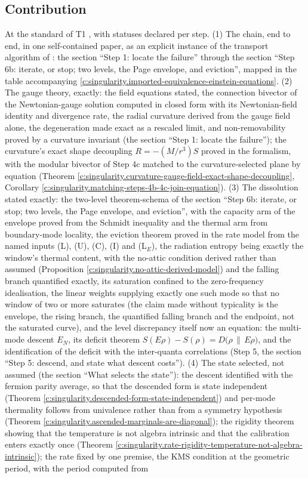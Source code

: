 \documentclass[11pt]{article}
\theoremstyle{definition}
\theoremstyle{plain}
\providecommand{\EN}{}\renewcommand{\EN}{E_{N}}
\providecommand{\rel}{}\renewcommand{\rel}[2]{D\bigl(#1 \,\|\, #2\bigr)}
\begin{document}
\subsection*{Contribution}
\label{c:note.singularity.setting-contribution}
At the standard of T1 \cite{ButlerT1}, with statuses declared per step.
(1) The chain, end to end, in one self-contained paper, as an explicit instance of the transport algorithm of \cite[\S 8.1]{ButlerT1}: the section ``Step 1: locate the failure'' through the section ``Step 6b: iterate, or stop; two levels, the Page envelope, and eviction'', mapped in the table accompanying \ref{c:singularity.imported-equivalence-einstein-equations}. (2) The gauge theory, exactly: the field equations stated, the connection bivector of the Newtonian-gauge solution computed in closed form with its Newtonian-field identity and divergence rate, the radial curvature derived from the gauge field alone, the degeneration made exact as a rescaled limit, and non-removability proved by a curvature invariant (the section ``Step 1: locate the failure''); the curvature's exact shape decoupling $R = -(M/r^3)S$ proved in the formalism, with the modular bivector of Step 4c matched to the curvature-selected plane by equation (Theorem \ref{c:singularity.curvature-gauge-field-exact-shape-decoupling}, Corollary \ref{c:singularity.matching-steps-4b-4c-join-equation}). (3) The dissolution stated exactly: the two-level theorem-schema of the section ``Step 6b: iterate, or stop; two levels, the Page envelope, and eviction'', with the capacity arm of the envelope proved from the Schmidt inequality and the thermal arm from boundary-mode locality, the eviction theorem proved in the rate model from the named inputs (L), (U), (C), (I) and (L$_E$), the radiation entropy being exactly the window's thermal content, with the no-attic condition derived rather than assumed (Proposition \ref{c:singularity.no-attic-derived-model}) and the falling branch quantified exactly, its saturation confined to the zero-frequency idealisation, the linear weights supplying exactly one such mode so that no window of two or more saturates (the claim made without typicality is the envelope, the rising branch, the quantified falling branch and the endpoint, not the saturated curve), and the level discrepancy itself now an equation: the multi-mode descent $\EN$, its deficit theorem $S(E\rho) - S(\rho) = \rel{\rho}{E\rho}$, and the identification of the deficit with the inter-quanta correlations (Step 5, the section ``Step 5: descend, and state what descent costs''). (4) The state selected, not assumed (the section ``What selects the state''): the descent identified with the fermion parity average, so that the descended form is state independent (Theorem \ref{c:singularity.descended-form-state-independent}) and per-mode thermality follows from univalence rather than from a symmetry hypothesis (Theorem \ref{c:singularity.ascended-marginals-are-diagonal}); the rigidity theorem showing that the temperature is not algebra intrinsic and that the calibration enters exactly once (Theorem \ref{c:singularity.rate-rigidity-temperature-not-algebra-intrinsic}); the rate fixed by one premise, the KMS condition at the geometric period, with the period computed from 
\end{document}
